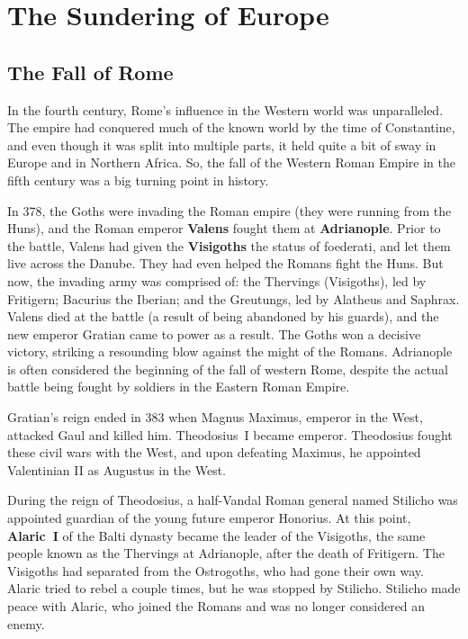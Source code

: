 \chapter{The Sundering of Europe}

\section{The Fall of Rome}

In the fourth century, Rome's influence in the Western world was unparalleled.
The empire had conquered much of the known world by the time of Constantine,
and even though it was split into multiple parts, it held quite a bit of sway
in Europe and in Northern Africa.
So, the fall of the Western Roman Empire in the fifth century was a big turning point in history.

In 378, the Goths were invading the Roman empire (they were running from the Huns),
and the Roman emperor \textbf{Valens} fought them at \textbf{Adrianople}.
Prior to the battle, Valens had given the \textbf{Visigoths} the status of foederati, and let them live across the Danube.
They had even helped the Romans fight the Huns.
But now, the invading army was comprised of:
the Thervings (Visigoths), led by Fritigern;
Bacurius the Iberian;
and the Greutungs, led by Alatheus and Saphrax.
Valens died at the battle (a result of being abandoned by his guards),
and the new emperor Gratian came to power as a result.
The Goths won a decisive victory, striking a resounding blow against the might of the Romans.
Adrianople is often considered the beginning of the fall of western Rome,
despite the actual battle being fought by soldiers in the Eastern Roman Empire.

Gratian's reign ended in 383 when Magnus Maximus, emperor in the West, attacked Gaul and killed him.
Theodosius~I became emperor.
Theodosius fought these civil wars with the West,
and upon defeating Maximus, he appointed Valentinian II as Augustus in the West.

During the reign of Theodosius, a half-Vandal Roman general named Stilicho
was appointed guardian of the young future emperor Honorius.
At this point, \textbf{Alaric~I} of the Balti dynasty became the leader of the Visigoths,
the same people known as the Thervings at Adrianople, after the death of Fritigern.
The Visigoths had separated from the Ostrogoths, who had gone their own way.
Alaric tried to rebel a couple times, but he was stopped by Stilicho.
Stilicho made peace with Alaric, who joined the Romans and was no longer considered an enemy.

